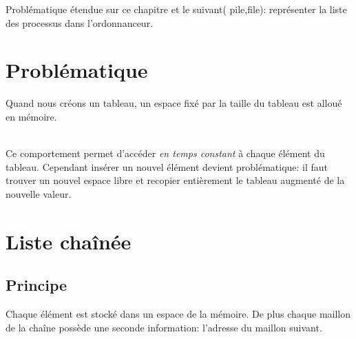 \documentclass[a4paper,11pt]{article}
\begin{document}
\begin{Form}
\begin{commentprof}
Problématique étendue sur ce chapitre et le suivant( pile,file): représenter la liste des processus dans l'ordonnanceur.
\end{commentprof}
\section{Problématique}
Quand nous créons un tableau, un espace fixé par la taille du tableau est alloué en mémoire. 
\begin{figure}[!h]
\centering
{}
\end{figure}
\\Ce comportement permet d'accéder \textit{en temps constant} à chaque élément du tableau. Cependant insérer un nouvel élément devient problématique: il faut trouver un nouvel espace libre et recopier entièrement le tableau augmenté de la nouvelle valeur.
\begin{center}
\end{center}
\section{Liste chaînée}
\subsection{Principe}
Chaque élément est stocké dans un espace de la mémoire. De plus chaque maillon de la chaîne possède une seconde information: l'adresse du maillon suivant.
\begin{figure}[!h]
\centering
{}
\end{figure}
\end{Form}
\end{document}
